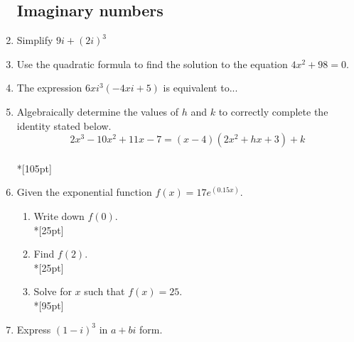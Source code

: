 \documentclass[12pt, oneside]{article}
\begin{document}
\begin{enumerate}
\subsection*{Imaginary numbers}
\item Simplify $9i+(2i)^3$
\item Use the quadratic formula to find the solution to the equation $4x^2+98=0$.
\item The expression $6xi^3(-4xi + 5)$ is equivalent to...

\newpage

\item Algebraically determine the values of $h$ and $k$ to correctly complete the identity stated below. \[2x^3-10x^2 +11x - 7 = (x - 4)(2x^2 + hx + 3) + k\]\\*[105pt]

\item Given the exponential function $\displaystyle f(x)=17e^{(0.15x)}$.
\begin{enumerate}
    \item Write down $f(0)$.\\*[25pt]
    \item Find $f(2)$.\\*[25pt]
    \item Solve for $x$ such that $f(x)=25$.\\*[95pt]
\end{enumerate}

\item Express $(1-i)^3 \text{ in } a+bi$ form. 

\end{enumerate}
\end{document}
